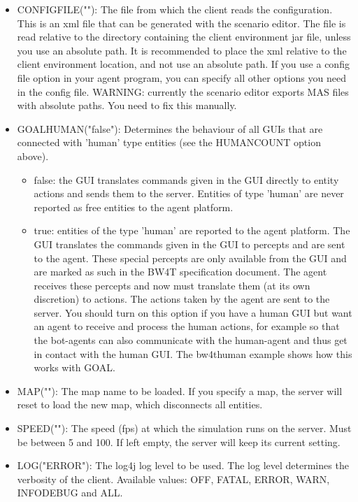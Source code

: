 \documentclass[11pt,a4paper]{article}
\begin{document}
\begin{itemize}
\item
    CONFIGFILE(""):
    The file from which the client reads the configuration. This is an xml file that can be generated with the scenario editor. The file is read relative to the directory containing the client environment jar file, unless you use an absolute path. It is recommended to place the xml relative to the client environment location, and not use an absolute path. If you use a config file option in your agent program, you can specify all other options you need in the config file. WARNING: currently the scenario editor exports MAS files with absolute paths. You need to fix this manually.
 
\item
    GOALHUMAN("false"):
    Determines the behaviour of all GUIs that are connected with 'human' type entities (see the HUMANCOUNT option above).
    \begin{itemize}
    \item false: the GUI translates commands given in the GUI directly to entity actions and sends them to the server. Entities of type 'human' are never reported as free entities to the agent platform. 
    \item true: entities of the type 'human' are reported to the agent platform. The GUI translates the commands given in the GUI to percepts and are sent to the agent. These special percepts are only available from the GUI and are marked as such in the BW4T specification document. The agent receives these percepts and now must translate them (at its own discretion) to actions. The actions taken by the agent are sent to the server. 
  You should turn on this option if you have a human GUI but want an agent to receive and process the human actions, for example so that the bot-agents can also communicate with the human-agent and thus get in contact with the human GUI. The bw4thuman example shows how this works with GOAL.
  \end{itemize}

\item
    MAP(""):
    The map name to be loaded. If you specify a map, the server will reset to load the new map, which disconnects all entities.
     
\item    
    SPEED(""):
    The speed (fps) at which the simulation runs on the server. Must be between 5 and 100. If left empty, the server will keep its current setting.

\item    
    LOG("ERROR"):
    The log4j log level to be used. The log level determines the verbosity of the client. Available values: OFF, FATAL, ERROR, WARN, INFODEBUG and ALL.

\end{itemize}
\end{document}
